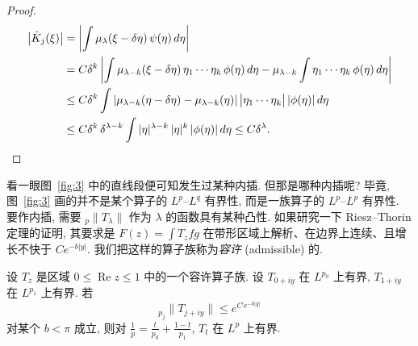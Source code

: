 \begin{proof}
\begin{align*}
\bigl|\hat{K}_{j}(\xi)\bigr|&=\left|\int\mu_{\lambda}(\xi-\delta\eta)\,\psi(\eta)\,d\eta\right| \\
&=C\delta^{k}\left|\int\mu_{\lambda-k}(\xi-\delta\eta)\,\eta_{1}\cdots\eta_{k}\,\phi(\eta)\,d\eta
-\mu_{\lambda-k}\int\eta_{1}\cdots\eta_{k}\,\phi(\eta)\,d\eta\right| \\
&\leq C\delta^{k}\int|\mu_{\lambda-k}(\eta-\delta\eta)-\mu_{\lambda-k}(\eta)|\,\bigl|\eta_{1}\cdots\eta_{k}\bigr|\,|\phi(\eta)|\,d\eta \\
&\leq C\delta^{k}\,\delta^{\lambda-k}\int|\eta|^{\lambda-k}\,|\eta|^{k}\,|\phi(\eta)|\,d\eta
\leq C\delta^{\lambda}. \qedhere
\end{align*}
\end{proof}

看一眼图~\ref{fig:3} 中的直线段便可知发生过某种内插. 但那是哪种内插呢? 毕竟, 图~\ref{fig:3} 画的并不是某个算子的 $L^p$--$L^q$ 有界性, 而是一族算子的 $L^p$--$L^p$ 有界性. 要作内插, 需要 ${}_p\|T_\lambda\|$ 作为 $\lambda$ 的函数具有某种凸性. 如果研究一下 Riesz--Thorin 定理的证明, 其要求是 $F(z)=\int T_zfg$ 在带形区域上解析、在边界上连续、且增长不快于 $Ce^{-b|y|}$. 我们把这样的算子族称为\emph{容许} (admissible) 的.

\begin{theorem}\label{thm:5.7}
设 $T_{z}$ 是区域 $0\leq\operatorname{Re}z\leq 1$ 中的一个容许算子族. 设 $T_{0+iy}$ 在 $L^{p_0}$ 上有界, $T_{1+iy}$ 在 $L^{p_1}$ 上有界. 若
\[
{}_{p_{j}}\|T_{j+iy}\|\leq e^{C\,e^{-b|y|}}
\]
对某个 $b<\pi$ 成立, 则对 $\frac{1}{p}=\frac{t}{p_0}+\frac{1-t}{p_1}$, $T_t$ 在 $L^p$ 上有界.
\end{theorem}

